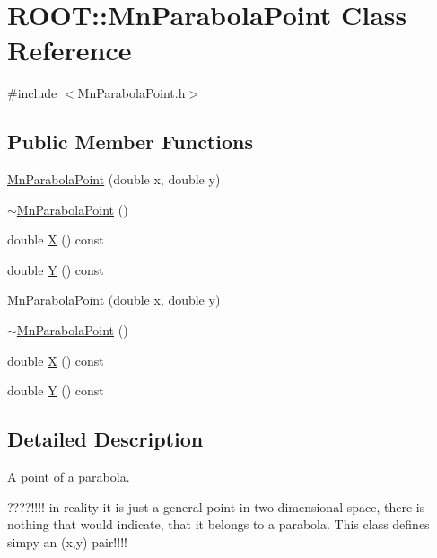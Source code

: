 \hypertarget{classROOT_1_1Minuit2_1_1MnParabolaPoint}{}\section{R\+O\+OT\+:\+:Mn\+Parabola\+Point Class Reference}
\label{classROOT_1_1Minuit2_1_1MnParabolaPoint}


{\ttfamily \#include $<$Mn\+Parabola\+Point.\+h$>$}

\subsection*{Public Member Functions}
\begin{DoxyCompactItemize}
\item 
\mbox{\hyperlink{classROOT_1_1Minuit2_1_1MnParabolaPoint_a6ce250c4449c7ca37c2772462a88190b}{Mn\+Parabola\+Point}} (double x, double y)
\item 
\mbox{\hyperlink{classROOT_1_1Minuit2_1_1MnParabolaPoint_ac2acc4c4843b4678005cb2d4610f7555}{$\sim$\+Mn\+Parabola\+Point}} ()
\item 
double \mbox{\hyperlink{classROOT_1_1Minuit2_1_1MnParabolaPoint_afdb080f9186b5fa6966a42394f2a0678}{X}} () const
\item 
double \mbox{\hyperlink{classROOT_1_1Minuit2_1_1MnParabolaPoint_abc0c0fa35bdee10c52229aadef4e20be}{Y}} () const
\item 
\mbox{\hyperlink{classROOT_1_1Minuit2_1_1MnParabolaPoint_a6ce250c4449c7ca37c2772462a88190b}{Mn\+Parabola\+Point}} (double x, double y)
\item 
\mbox{\hyperlink{classROOT_1_1Minuit2_1_1MnParabolaPoint_ac2acc4c4843b4678005cb2d4610f7555}{$\sim$\+Mn\+Parabola\+Point}} ()
\item 
double \mbox{\hyperlink{classROOT_1_1Minuit2_1_1MnParabolaPoint_afdb080f9186b5fa6966a42394f2a0678}{X}} () const
\item 
double \mbox{\hyperlink{classROOT_1_1Minuit2_1_1MnParabolaPoint_abc0c0fa35bdee10c52229aadef4e20be}{Y}} () const
\end{DoxyCompactItemize}


\subsection{Detailed Description}
A point of a parabola.

????!!!! in reality it is just a general point in two dimensional space, there is nothing that would indicate, that it belongs to a parabola. This class defines simpy an (x,y) pair!!!!


